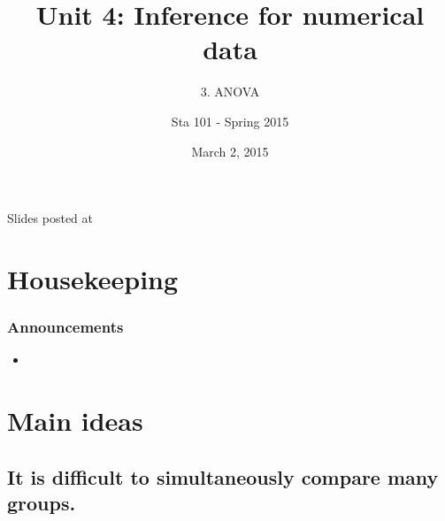 \documentclass[slidestop,compress,mathserif,12pt,t,professionalfonts,xcolor=table]{beamer}
\title{Unit 4: Inference for numerical data}
\subtitle{3. ANOVA}
\author{Sta 101 - Spring 2015}
\date{March 2, 2015}
\institute{Duke University, Department of Statistical Science}
\newcommand{\mainideaA}{It is difficult to simultaneously compare many groups.}
\begin{document}


\begin{frame}[plain]

\titlepage
\vfill
{\scriptsize {} \hfill Slides posted at  \webLink{\CourseSite}{\CourseSite}}
\addtocounter{framenumber}{-1} 

\end{frame}


\section{Housekeeping}


\begin{frame}
\frametitle{Announcements}

\begin{itemize}

\item 

\end{itemize}

\end{frame}


\section{Main ideas}


\subsection{\mainideaA}
\label{mi1}

\end{document}
